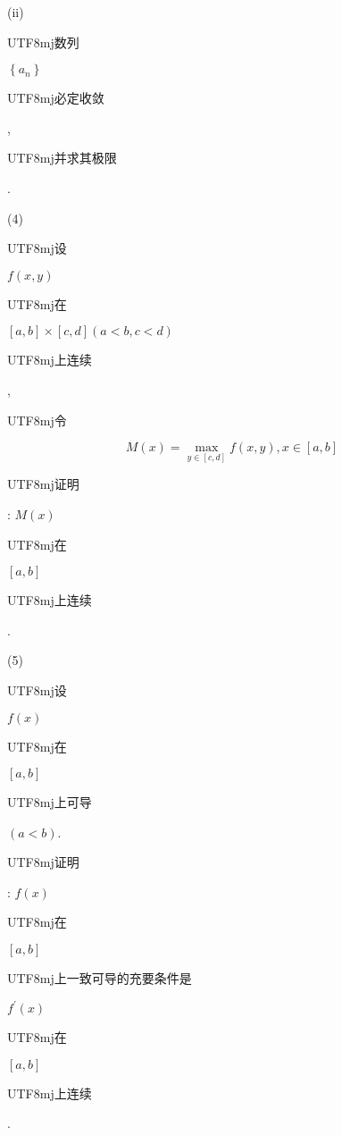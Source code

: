 \documentclass[10pt]{article}
\begin{document}
(ii) \begin{CJK}{UTF8}{mj}数列\end{CJK} $\left\{a_{n}\right\}$ \begin{CJK}{UTF8}{mj}必定收敛\end{CJK}, \begin{CJK}{UTF8}{mj}并求其极限\end{CJK}.

(4) \begin{CJK}{UTF8}{mj}设\end{CJK} $f(x, y)$ \begin{CJK}{UTF8}{mj}在\end{CJK} $[a, b] \times[c, d](a<b, c<d)$ \begin{CJK}{UTF8}{mj}上连续\end{CJK}, \begin{CJK}{UTF8}{mj}令\end{CJK}
$$
M(x)=\max _{y \in[c, d]} f(x, y), x \in[a, b]
$$
\begin{CJK}{UTF8}{mj}证明\end{CJK}: $M(x)$ \begin{CJK}{UTF8}{mj}在\end{CJK} $[a, b]$ \begin{CJK}{UTF8}{mj}上连续\end{CJK}.

(5) \begin{CJK}{UTF8}{mj}设\end{CJK} $f(x)$ \begin{CJK}{UTF8}{mj}在\end{CJK} $[a, b]$ \begin{CJK}{UTF8}{mj}上可导\end{CJK} $(a<b)$. \begin{CJK}{UTF8}{mj}证明\end{CJK}: $f(x)$ \begin{CJK}{UTF8}{mj}在\end{CJK} $[a, b]$ \begin{CJK}{UTF8}{mj}上一致可导的充要条件是\end{CJK} $f^{\prime}(x)$ \begin{CJK}{UTF8}{mj}在\end{CJK} $[a, b]$ \begin{CJK}{UTF8}{mj}上连续\end{CJK}.
\end{document}
